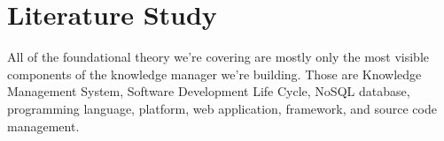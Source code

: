\chapter{Literature Study}
\label{chap:literature-study}

All of the foundational theory we're covering are mostly only the most visible components of the knowledge manager we're building. Those are Knowledge Management System, Software Development Life Cycle, NoSQL database, programming language, platform, web application, framework, and source code management.

